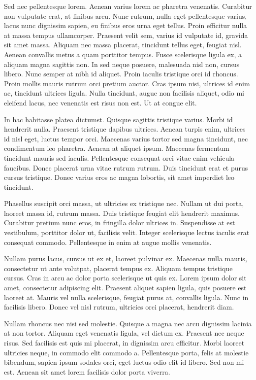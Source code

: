 Sed nec pellentesque lorem. Aenean varius lorem ac pharetra venenatis. Curabitur non vulputate erat, at finibus arcu. Nunc rutrum, nulla eget pellentesque varius, lacus nunc dignissim sapien, eu finibus eros urna eget tellus. Proin efficitur nulla at massa tempus ullamcorper. Praesent velit sem, varius id vulputate id, gravida sit amet massa. Aliquam nec massa placerat, tincidunt tellus eget, feugiat nisl. Aenean convallis metus a quam porttitor tempus. Fusce scelerisque ligula ex, a aliquam magna sagittis non. In sed neque posuere, malesuada nisl non, cursus libero. Nunc semper at nibh id aliquet. Proin iaculis tristique orci id rhoncus. Proin mollis mauris rutrum orci pretium auctor. Cras ipsum nisi, ultrices id enim ac, tincidunt ultrices ligula. Nulla tincidunt, augue non facilisis aliquet, odio mi eleifend lacus, nec venenatis est risus non est. Ut at congue elit.

In hac habitasse platea dictumst. Quisque sagittis tristique varius. Morbi id hendrerit nulla. Praesent tristique dapibus ultrices. Aenean turpis enim, ultrices id nisl eget, luctus tempor orci. Maecenas varius tortor sed magna tincidunt, nec condimentum leo pharetra. Aenean at aliquet ipsum. Maecenas fermentum tincidunt mauris sed iaculis. Pellentesque consequat orci vitae enim vehicula faucibus. Donec placerat urna vitae rutrum rutrum. Duis tincidunt erat et purus cursus tristique. Donec varius eros ac magna lobortis, sit amet imperdiet leo tincidunt.

Phasellus suscipit orci massa, ut ultricies ex tristique nec. Nullam ut dui porta, laoreet massa id, rutrum massa. Duis tristique feugiat elit hendrerit maximus. Curabitur pretium nunc eros, in fringilla dolor ultrices in. Suspendisse at est vestibulum, porttitor dolor ut, facilisis velit. Integer scelerisque lectus iaculis erat consequat commodo. Pellentesque in enim at augue mollis venenatis.

Nullam purus lacus, cursus ut ex et, laoreet pulvinar ex. Maecenas nulla mauris, consectetur ut ante volutpat, placerat tempus ex. Aliquam tempus tristique cursus. Cras in arcu ac dolor porta scelerisque ut quis ex. Lorem ipsum dolor sit amet, consectetur adipiscing elit. Praesent aliquet sapien ligula, quis posuere est laoreet at. Mauris vel nulla scelerisque, feugiat purus at, convallis ligula. Nunc in facilisis libero. Donec vel nisl rutrum, ultricies orci placerat, hendrerit diam.

Nullam rhoncus nec nisi sed molestie. Quisque a magna nec arcu dignissim lacinia at non tortor. Aliquam eget venenatis ligula, vel dictum ex. Praesent nec neque risus. Sed facilisis est quis mi placerat, in dignissim arcu efficitur. Morbi laoreet ultricies neque, in commodo elit commodo a. Pellentesque porta, felis at molestie bibendum, sapien ipsum sodales orci, eget luctus odio elit id libero. Sed non mi est. Aenean sit amet lorem facilisis dolor porta viverra.

